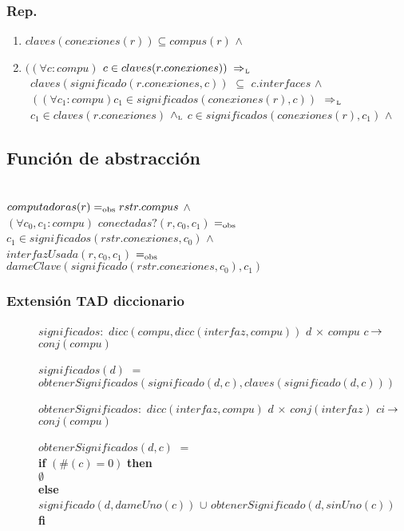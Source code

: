 \subsubsection*{Rep.}
\begin{enumerate}
\item[] $claves(conexiones(r)) \subseteq compus(r)$ $\land$
\item[] $((\forall c : compu)$ $c \in claves(r.conexiones)) \impluego$ \\
		\indent $\ \ claves(significado(r.conexiones,c))$ $\subseteq$ $c.interfaces$ $\land$ \\
		\indent $\ \ ((\forall c_1 : compu) c_1 \in significados(conexiones(r),c))$ $\impluego$ \\
		\indent $\ \ c_1 \in claves(r.conexiones)$ $\land_{\mathrm{\scriptscriptstyle{L}}}$ $c \in significados(conexiones(r),c_1)$ $\land$ \\
\end{enumerate}

\subsection{Función de abstracción}

 \\
$computadoras(r) =_{\mathrm{obs}} rstr.compus$ $\land$ \\
$(\forall c_0,c_1:compu)$ $conectadas?(r,c_0,c_1)$ $=_{\mathrm{obs}}$ $c_1 \in significados(rstr.conexiones,c_0)$ $\land$\\
$interfazUsada(r,c_0,c_1)$ $=_{\mathrm{obs}}$ $dameClave(significado(rstr.conexiones,c_0),c_1)$

\subsubsection*{Extensión TAD diccionario}
\begin{description} 
\item[] $significados:$ $dicc(compu,dicc(interfaz,compu))$ $d$ $\times$ $compu$ $c$ $\!\rightarrow\!$ $conj(compu)$ \setlength{\parindent}{1cm} \indent
\item[] $significados(d)$ $=$  $obtenerSignificados(significado(d,c),claves(significado(d,c)))$
\\
\item[] $obtenerSignificados:$ $dicc(interfaz,compu)$ $d$ $\times$ $conj(interfaz)$ $ci$ $\!\rightarrow\!$ $conj(compu)$ \setlength{\parindent}{0.1cm} \indent
\item[] $obtenerSignificados(d,c)$ $=$
	\setlength{\parindent}{1cm}\\ \textbf{if} $(\#(c) = 0)$ \textbf{then}
		\\ \indent$\emptyset$
	\\ \textbf{else} 
		\\\indent  $significado(d,dameUno(c))$ $\cup$ $obtenerSignificado(d,sinUno(c))$
	\\  \textbf{fi} 
\end{description}

